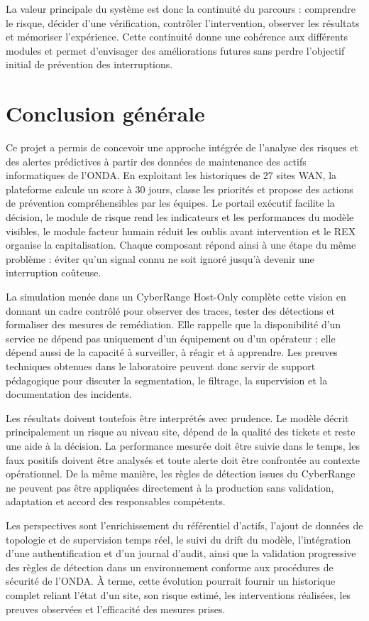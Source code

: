 \documentclass[12pt,a4paper,oneside]{report}
\newcommand{\frontchapter}[1]{%
  \chapter*{#1}%
  \addcontentsline{toc}{chapter}{#1}%
}
\begin{document}
La valeur principale du système est donc la continuité du parcours : comprendre le risque, décider d’une vérification, contrôler l’intervention, observer les résultats et mémoriser l’expérience. Cette continuité donne une cohérence aux différents modules et permet d’envisager des améliorations futures sans perdre l’objectif initial de prévention des interruptions.


\frontchapter{Conclusion générale}
Ce projet a permis de concevoir une approche intégrée de l’analyse des risques et des alertes prédictives à partir des données de maintenance des actifs informatiques de l’ONDA. En exploitant les historiques de 27 sites WAN, la plateforme calcule un score à 30 jours, classe les priorités et propose des actions de prévention compréhensibles par les équipes. Le portail exécutif facilite la décision, le module de risque rend les indicateurs et les performances du modèle visibles, le module facteur humain réduit les oublis avant intervention et le REX organise la capitalisation. Chaque composant répond ainsi à une étape du même problème : éviter qu’un signal connu ne soit ignoré jusqu’à devenir une interruption coûteuse.

La simulation menée dans un CyberRange Host-Only complète cette vision en donnant un cadre contrôlé pour observer des traces, tester des détections et formaliser des mesures de remédiation. Elle rappelle que la disponibilité d’un service ne dépend pas uniquement d’un équipement ou d’un opérateur ; elle dépend aussi de la capacité à surveiller, à réagir et à apprendre. Les preuves techniques obtenues dans le laboratoire peuvent donc servir de support pédagogique pour discuter la segmentation, le filtrage, la supervision et la documentation des incidents.

Les résultats doivent toutefois être interprétés avec prudence. Le modèle décrit principalement un risque au niveau site, dépend de la qualité des tickets et reste une aide à la décision. La performance mesurée doit être suivie dans le temps, les faux positifs doivent être analysés et toute alerte doit être confrontée au contexte opérationnel. De la même manière, les règles de détection issues du CyberRange ne peuvent pas être appliquées directement à la production sans validation, adaptation et accord des responsables compétents.

Les perspectives sont l’enrichissement du référentiel d’actifs, l’ajout de données de topologie et de supervision temps réel, le suivi du drift du modèle, l’intégration d’une authentification et d’un journal d’audit, ainsi que la validation progressive des règles de détection dans un environnement conforme aux procédures de sécurité de l’ONDA. À terme, cette évolution pourrait fournir un historique complet reliant l’état d’un site, son risque estimé, les interventions réalisées, les preuves observées et l’efficacité des mesures prises.
\end{document}

